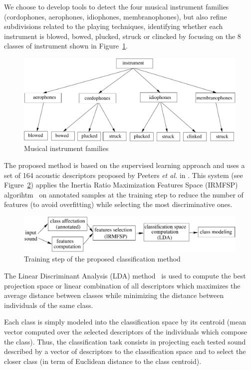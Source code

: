 \documentclass{sig-alternate}
\begin{document}
We choose to develop tools to detect the four musical instrument families (cordophones, aerophones, idiophones, membranophones), but also refine subdivisions related to the playing techniques, identifying whether each instrument is blowed, bowed, plucked, struck or clincked by focusing on the 8 classes of instrument shown in Figure~\ref{fig:instruments}.

\begin{figure}[htb]
  \centering
  \includegraphics[width=0.9\linewidth]{img/taxonomie_diadems.pdf}
  \caption{Musical instrument families}
  \label{fig:instruments}
\end{figure}

The proposed method is based on the supervised learning approach and uses a set of 164 acoustic descriptors 
proposed by Peeters \textit{et al.} in \cite{timbre_toolbox}.
This system (see Figure~\ref{fig:inst_classif_method}) applies the Inertia Ratio Maximization Features Space (IRMFSP) algorihtm~\cite{aes_irmfsp} 
on annotated samples at the training step to reduce the number of features (to avoid overfitting) while selecting the most discriminative ones. %

\begin{figure}[htb]
 \centering
 \includegraphics[width=0.9\linewidth]{img/method}
 \caption{Training step of the proposed classification method}
 \label{fig:inst_classif_method}
\end{figure}

The Linear Discriminant Analysis (LDA) method~\cite{lda_book} is used to compute the best projection space 
or linear combination of all descriptors which maximizes the average distance between classes while minimizing the 
distance between individuals of the same class.

Each class is simply modeled into the classification space by its centroid (mean vector computed over the selected descriptors of the individuals which compose the class).
Thus, the classification task consists in projecting each tested sound described by a vector of descriptors
to the classification space and to select the closer class (in term of Euclidean distance to the class centroid). 
\end{document}
